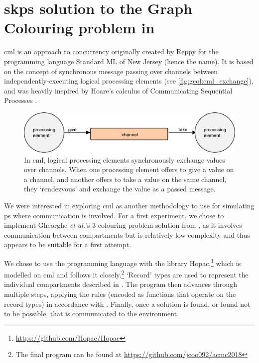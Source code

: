 \section{\label{sec:gcol:cml}\texorpdfstring{\gls{skps}}{Simple Kernel P systems} solution to the Graph Colouring problem in \texorpdfstring{}{Concurrent ML}}
\Gls{cml} is an approach to concurrency originally created by Reppy \cite{Reppy1991} for the programming language Standard ML of New Jersey (hence the name).  It is based on the concept of synchronous message passing over channels between independently-executing logical processing elements \cite{Panangaden1997} (see \autoref{fig:gcol:cml_exchange}), and was heavily inspired by Hoare's calculus of Communicating Sequential Processes \cite{Hoare1985}.  

\begin{figure}
    \centering
    \includegraphics[width=\textwidth]{chapters/gcol/figs/cml_exchange.eps}
    \caption[Diagram of the message-passing primitive in ]{In \gls{cml}, logical processing elements synchronously exchange values over channels.  When one processing element offers to give a value on a channel, and another offers to take a value on the same channel, they ‘rendezvous’ and exchange the value as a passed message.}
    \label{fig:gcol:cml_exchange}
\end{figure}

We were interested in exploring \gls{cml} as another methodology to use for simulating \gls{ps} where communication is involved.  For a first experiment, we chose to implement Gheorghe \textit{et al.}'s 3-colouring problem solution from \cite{Gheorghe2013}, as it involves communication between compartments but is relatively low-complexity and thus appears to be suitable for a first attempt.

We chose to use the programming language \fsharp{} with the library Hopac,\footnote{\url{https://github.com/Hopac/Hopac}} which is modelled on \gls{cml} and follows it closely.\footnote{The final program can be found at \url{https://github.com/jcoo092/acmc2018}}  `Record' types are used to represent the individual compartments described in \cite{Gheorghe2013}.  The program then advances through multiple steps, applying the rules (encoded as functions that operate on the record types) in accordance with \cite{Gheorghe2013}.  Finally, once a solution is found, or found not to be possible, that is communicated to the environment.

